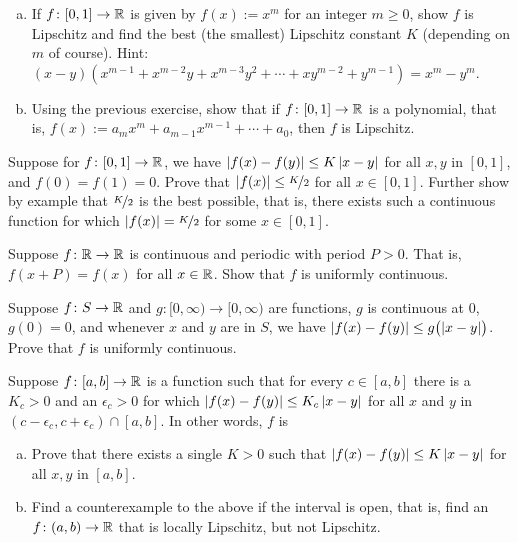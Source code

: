 \begin{exercise}
\pagebreak[2]
\leavevmode
\begin{enumerate}[a)]
\item
If $f \colon [0,1] \to {\mathbb{R}}$ is given by $f(x) := x^m$ for an integer
$m \geq 0$,
show $f$ is Lipschitz and find the best (the smallest) Lipschitz constant
$K$ (depending on $m$ of course).
Hint: $(x-y)(x^{m-1} + x^{m-2}y + x^{m-3}y^2 + \cdots + x y^{m-2} + y^{m-1}) = x^m - y^m$.
\item
Using the previous exercise, show that if $f \colon [0,1] \to {\mathbb{R}}$
is a polynomial, that is, $f(x) := a_m x^m + a_{m-1} x^{m-1} + \cdots + a_0$,
then $f$ is Lipschitz.
\end{enumerate}
\end{exercise}

\begin{exercise}
\pagebreak[2]
Suppose for $f \colon [0,1] \to {\mathbb{R}}$, we have $\left\lvert {f(x)-f(y)} \right\rvert \leq K
\left\lvert {x-y} \right\rvert$ for all $x,y$ in $[0,1]$,
and $f(0) = f(1) = 0$.
Prove that $\left\lvert {f(x)} \right\rvert \leq \nicefrac{K}{2}$ for all $x \in [0,1]$.  Further show by example that
$\nicefrac{K}{2}$ is the best possible, that is, there exists such a continuous function
for which $\left\lvert {f(x)} \right\rvert = \nicefrac{K}{2}$ for some $x \in [0,1]$.
\end{exercise}

\begin{exercise}
Suppose $f \colon {\mathbb{R}} \to {\mathbb{R}}$ is continuous and periodic with period
$P > 0$.  That is, $f(x+P) = f(x)$ for all $x \in {\mathbb{R}}$.  Show that $f$
is uniformly continuous.
\end{exercise}

\begin{exercise}
Suppose $f \colon S \to {\mathbb{R}}$ and $g \colon [0,\infty) \to [0,\infty)$
are functions, $g$ is continuous at $0$, $g(0) = 0$, and
whenever $x$ and $y$ are in $S$, we have $\left\lvert {f(x)-f(y)} \right\rvert \leq
g\bigl(\left\lvert {x-y} \right\rvert\bigr)$.
Prove that $f$ is uniformly continuous.
\end{exercise}

\begin{exercise}
Suppose $f \colon [a,b] \to {\mathbb{R}}$ is a function such that for every $c \in
[a,b]$ there is a $K_c > 0$ and an $\epsilon_c > 0$ for which
$\left\lvert {f(x)-f(y)} \right\rvert \leq K_c \left\lvert {x-y} \right\rvert$ for all $x$ and $y$ in
$(c-\epsilon_c,c+\epsilon_c) \cap [a,b]$.  In other words, $f$ is
\begin{enumerate}[a)]
\item
Prove that there exists a single $K > 0$ such that
$\left\lvert {f(x)-f(y)} \right\rvert \leq K \left\lvert {x-y} \right\rvert$ for all $x,y$ in $[a,b]$.
\item
Find a counterexample to the above if the interval is open, that is,
find an $f \colon (a,b) \to {\mathbb{R}}$ that is locally Lipschitz, but not
Lipschitz.
\end{enumerate}
\end{exercise}

